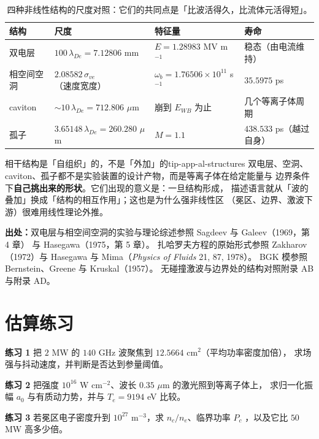 \begin{table}[htbp]
\centering
\small
\caption{四种非线性结构的尺度对照：它们的共同点是「比波活得久，比流体元活得短」。}
\label{tab:app-al-structures}
\begin{tabular}{p{3.4cm}p{3.8cm}p{3.6cm}p{3.0cm}}
\toprule
结构 & 尺度 & 特征量 & 寿命 \\
\midrule
双电层 & $100\,\lambda_{De} = 7.12806$ mm & $E = 1.28983$ MV m$^{-1}$ & 稳态（由电流维持） \\
相空间空洞 & $2.08582\,\sigma_{ve}$（速度宽度） & $\omega_b = 1.76506\times10^{11}$ s$^{-1}$ & $35.5975$ ps \\
caviton & $\sim10\,\lambda_{De} = 712.806$ $\mu$m & 崩到 $E_{WB}$ 为止 & 几个等离子体周期 \\
孤子 & $3.65148\,\lambda_{De} = 260.280$ $\mu$m & $M = 1.1$ & $438.533$ ps（越过自身） \\
\bottomrule
\end{tabular}

\end{table}

\begin{tip}{相干结构是「自组织」的，不是「外加」的}{tip-app-al-structures}
双电层、空洞、caviton、孤子都不是实验装置的设计产物，而是等离子体在给定能量与
边界条件下\textbf{自己挑出来的形状}。它们出现的意义是：一旦结构形成，
描述语言就从「波的叠加」换成「结构的相互作用」；这也是为什么强非线性区
（冕区、边界、激波下游）很难用线性理论外推。
\end{tip}

{\footnotesize
\textbf{出处：}双电层与相空间空洞的实验与理论综述参照 Sagdeev 与 Galeev（1969，第 4 章）
与 Hasegawa（1975，第 5 章）。
扎哈罗夫方程的原始形式参照 Zakharov（1972）与
Hasegawa 与 Mima（\emph{Physics of Fluids} 21, 87, 1978）。
BGK 模参照
Bernstein、Greene 与 Kruskal（1957）。
无碰撞激波与边界处的结构对照附录 AB 与附录 AD。
\section{估算练习}
\label{sec:app-al-problems}
}

\textbf{练习 1} 把 $2$ MW 的 $140$ GHz 波聚焦到 $12.5664$ cm$^2$（平均功率密度加倍），
求场强与抖动速度，并判断是否达到参量阈值。

\textbf{练习 2} 把强度 $10^{16}$ W cm$^{-2}$、波长 $0.35$ $\mu$m 的激光照到等离子体上，
求归一化振幅 $a_0$ 与有质动力势，并与 $T_e = 9194$ eV 比较。

\textbf{练习 3} 若冕区电子密度升到 $10^{27}$ m$^{-3}$，求 $n_c/n_e$、临界功率 $P_c$
，以及它比 $50$ MW 高多少倍。

